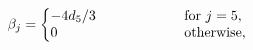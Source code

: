 \begin{equation}
    \label{betascircle}
    \beta_j=
    \left\{
        \begin{minipage}[c]{7cm}
            \begin{tabbing}
            $-4 d_5 / 3 $  \=\qquad\=\qquad\=\qquad
            {\rm for}       $j=5$,\\
            0 \>\qquad\>\qquad\>\qquad
            \rm{otherwise},
            \end{tabbing}
    \end{minipage}
\right.
\end{equation}

